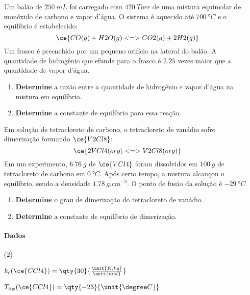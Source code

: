 \begin{problem}[
	id={2F52},
	path={/home/braun/Documents/Developer/braunchem/data/problems/Q2/2F/2F52}
]
Um balão de {\(\qty{250}{\unit{mL}}\)} foi carregado com {\(\qty{420}{\unit{Torr}}\)} de uma mistura equimolar de monóxido de carbono e vapor d'água.
O sistema é aquecido até {\(\qty{700}{\unit{\degree C}}\)} e o equilíbrio é estabelecido: {\[
    \ce{ CO(g) + H2O(g) <=> CO2(g) + 2 H2(g) }
\]} Um frasco é preenchido por um pequeno orifício na lateral do balão. A quantidade de hidrogênio que efunde para o frasco é {\(\num{2,25}\)} vezes
maior que a quantidade de vapor d'água.

\begin{enumerate}
\def\labelenumi{\alph{enumi}.}
\tightlist
\item
  \textbf{Determine} a razão entre a quantidade de hidrogênio e vapor d'água na mistura em equilíbrio.
\item
  \textbf{Determine} a constante de equilíbrio para essa reação.
\end{enumerate}

\end{problem}


\begin{problem}[
	id={2F53},
	path={/home/braun/Documents/Developer/braunchem/data/problems/Q2/2F/2F53}
]
Em solução de tetracloreto de carbono, o tetracloreto de vanádio sofre dimerização formando {\(\ce{V2Cl8}\)}: {\[
    \ce{ 2 VCl4(org) <=> V2Cl8(org) }
\]} Em um experimento, {\(\qty{6,76}{\unit{g}}\)} de {\(\ce{VCl4}\)} foram dissolvidos em {\(\qty{100}{\unit{g}}\)} de tetracloreto de carbono em
{\(\qty{0}{\unit{\degree C}}\)}. Após certo tempo, a mistura alcançou o equilíbrio, sendo a densidade {\(\qty{1,78}{\unit{g.cm^{-3}}}\)}. O ponto de
fusão da solução é {\(\qty{-29}{\unit{\degree C}}\)}

\begin{enumerate}
\def\labelenumi{\alph{enumi}.}
\tightlist
\item
  \textbf{Determine} o grau de dimerização do tetracloreto de vanádio.
\item
  \textbf{Determine} a constante de equilíbrio de dimerização.
\end{enumerate}
\paragraph{Dados}\small 
\begin{datalist}
[start = 1](2)\item $k_\mathrm{c}(\ce{CCl4}) = \qty{30}{\tfrac{\unit{K.kg}}{\unit{mol}}}$
\item $T_\mathrm{fus}(\ce{CCl4}) = \qty{-23}{\unit{\degree C}}$
\end{datalist}

\end{problem}


